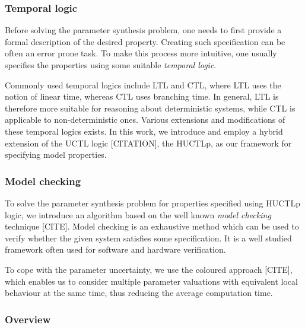
\subsubsection{\textbf{Temporal logic}}

Before solving the parameter synthesis problem, one needs to first provide a formal description of the desired property. Creating such specification can be often an error prone task. To make this process more intuitive, one usually specifies the properties using some suitable \emph{temporal logic}. 


Commonly used temporal logics include \acf{LTL} and \acf{CTL}, where \ac{LTL} uses the notion of linear time, whereas \ac{CTL} uses branching time. In general, \ac{LTL} is therefore more suitable for reasoning about deterministic systems, while \ac{CTL} is applicable to non-deterministic ones. Various extensions and modifications of these temporal logics exists. In this work, we introduce and employ a hybrid extension of the UCTL logic [CITATION], the \acf{HUCTLp}, as our framework for specifying model properties.

\subsubsection{\textbf{Model checking}}

To solve the parameter synthesis problem for properties specified using \ac{HUCTLp} logic, we introduce an algorithm based on the well known \emph{model checking} technique [CITE]. Model checking is an exhaustive method which can be used to verify whether the given system satisfies some specification. It is a well studied framework often used for software and hardware verification.

To cope with the parameter uncertainty, we use the coloured approach [CITE], which enables us to consider multiple parameter valuations with equivalent local behaviour at the same time, thus reducing the average computation time.

\subsubsection{\textbf{Overview}}
 
